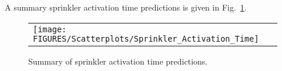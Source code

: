A summary sprinkler activation time predictions is given in Fig.~\ref{sprinkler_activation_summary}. 

\begin{figure}[ht]
\begin{center}
\begin{tabular}{l}
\texttt{[image: FIGURES/Scatterplots/Sprinkler\_Activation\_Time]}
\end{tabular}
\end{center}
\caption[Summary of sprinkler activation time predictions.]
{Summary of sprinkler activation time predictions.}
\label{sprinkler_activation_summary}
\end{figure}

